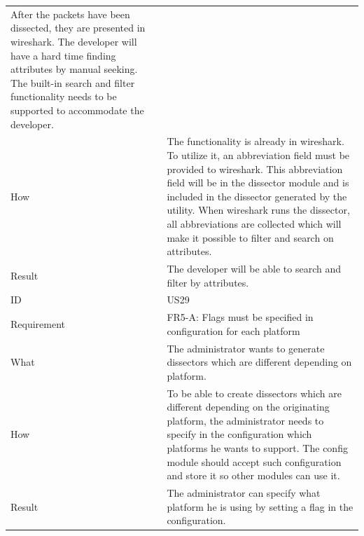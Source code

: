 \begin{table}[htbp]
{\begin{tabularx}{1.2\textwidth}{l X}
	After the \glspl{packet} have been dissected, they are presented in \Gls{wireshark}. The developer will have a hard time finding 
	attributes by manual seeking. The built-in search and filter functionality needs to be supported to accommodate the developer. \\
	How & The functionality is already in \Gls{wireshark}. To utilize it, an abbreviation field must be provided to \Gls{wireshark}. This abbreviation field will be in the \gls{dissector} module
	and is included in the \gls{dissector} generated by the \gls{utility}. When \Gls{wireshark} runs the \gls{dissector}, all abbreviations are collected which will make it possible to filter and search
	on attributes. \\
	Result & The developer will be able to search and filter by attributes. \\
	\midrule
	ID & US29 \\
	Requirement & FR5-A: Flags must be specified in configuration for each platform \\
	What & The administrator wants to generate \glspl{dissector} which are different depending on platform. \\
	How & To be able to create \glspl{dissector} which are different depending on the originating platform, the administrator needs to specify in the configuration which platforms he wants to support.
	The config module should accept such configuration and store it so other modules can use it. \\ 
	Result & The administrator can specify what platform he is using by setting a flag in the configuration. \\
	\midrule
\end{tabularx}}
\end{table}


